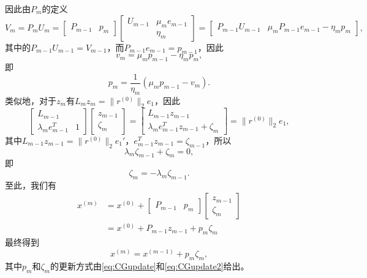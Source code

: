 \documentclass[a4paper,10pt]{ctexart}
\begin{document}
因此由$ P_m $的定义
\[
    V_m = P_mU_m = 
    \begin{bmatrix} 
        P_{m-1} & p_m
    \end{bmatrix}
    \begin{bmatrix} 
        U_{m-1} & \mu_m e_{m-1} \\
        & \eta_m
    \end{bmatrix} =
    \begin{bmatrix} 
        P_{m-1}U_{m-1} & \mu_mP_{m-1}e_{m-1}-\eta_m p_m
    \end{bmatrix},
\]
其中的$ P_{m-1}U_{m-1} = V_{m-1} $，而$ P_{m-1}e_{m-1} = p_{m-1} $，因此
\[
    v_m = \mu_mp_{m-1}-\eta_m p_m,
\]
即
\begin{equation}\label{eq:CGupdate}
    p_m = \frac{1}{\eta_m}(\mu_m p_{m-1} - v_m).
\end{equation}
类似地，对于$ z_m $有$ L_m z_m = \| r^{(0)} \|_2e_1 $，因此
\[
    \begin{bmatrix} 
        L_{m-1} & \\
        \lambda_m e_{m-1}^T & 1 
    \end{bmatrix} 
    \begin{bmatrix} 
        z_{m-1} \\ \zeta_m
    \end{bmatrix} = 
    \begin{bmatrix} 
        L_{m-1}z_{m-1}\\  \lambda_m e^T_{m-1} z_{m-1} + \zeta_m
    \end{bmatrix} 
    = \| r^{(0)} \|_2 e_1,
\]
其中$ L_{m-1}z_{m-1} = \| r^{(0)} \|_2e_1' $，$ e^T_{m-1} z_{m-1} = \zeta_{m-1} $，所以
\[
    \lambda_m \zeta_{m-1} + \zeta_m = 0,
\]
即
\begin{equation}\label{eq:CGupdate2}
    \zeta_m = -\lambda_m \zeta_{m-1}.
\end{equation}
至此，我们有
\[
    \begin{aligned}
        x^{(m)} &= x^{(0)} + 
    \begin{bmatrix} 
        P_{m-1} & p_m 
    \end{bmatrix} 
    \begin{bmatrix} 
        z_{m-1} \\ \zeta_m
    \end{bmatrix} \\
    &= x^{(0)}+P_{m-1}z_{m-1} + p_m\zeta_m 
    \end{aligned}
\]
最终得到
\begin{equation}\label{eq:CG}
    x^{(m)} = x^{(m-1)} + p_m\zeta_m,
\end{equation}
其中$ p_m $和$ \zeta_m $的更新方式由\eqref{eq:CGupdate}和\eqref{eq:CGupdate2}给出。
\end{document}

